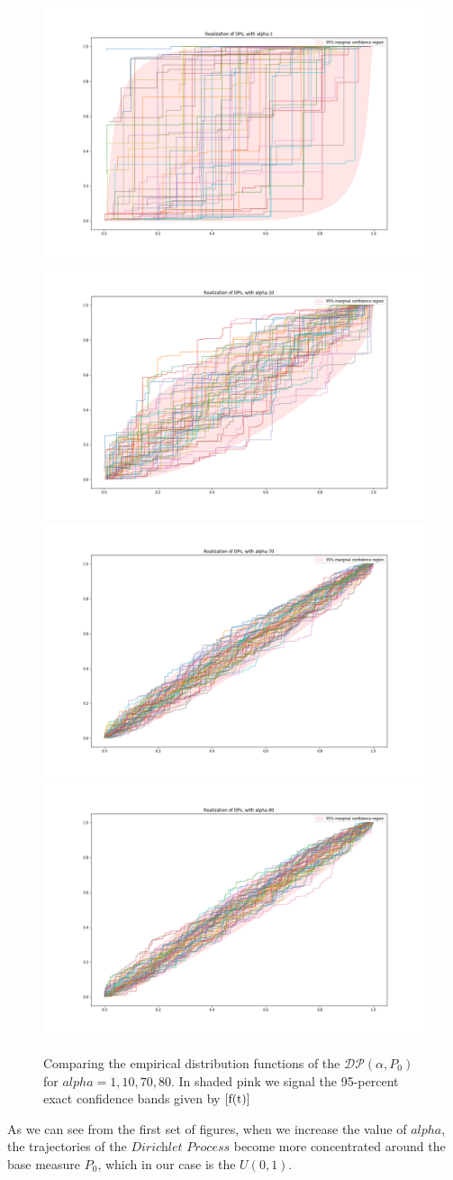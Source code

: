 \documentclass{article}
\begin{document}
\begin{figure}[H]
\label{f1}
\begin{minipage}{1\textwidth}
\includegraphics[width=0.5\linewidth]{DP1.png}\hfill
\includegraphics[width=0.5\linewidth]{DP_alpha=10.png}\hfill
 \includegraphics[width=0.5\linewidth]{DP_alpha=70.png}\hfill
\includegraphics[width=0.5\linewidth]{DP_alpha=80.png}
\end{minipage}
\caption{Comparing the empirical distribution functions of the $\mathcal{DP}(\alpha, P_0)$ for $alpha=1, 10, 70, 80$. In shaded pink we signal the 95-percent exact confidence bands given by $\eqref{f(t)}$ }
\end{figure}


As we can see from the first set of figures, when we increase the value of $alpha$, the trajectories of the $\textit{Dirichlet Process}$ become more concentrated around the base measure $P_0$, which in our case is the $U(0,1)$.
\end{document}
